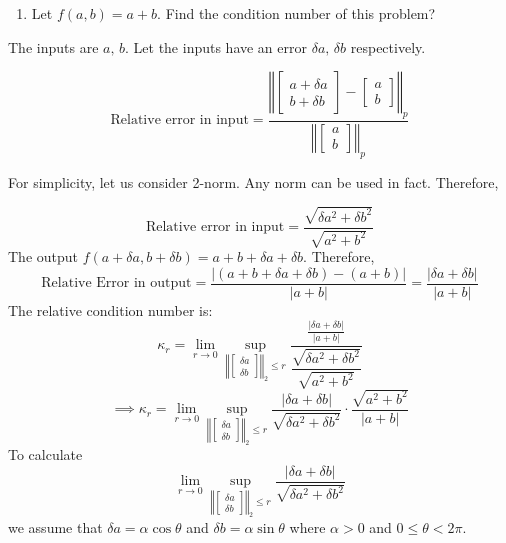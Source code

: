 \documentclass[
]{book}
\providecommand{\tightlist}{%
  \setlength{\itemsep}{0pt}\setlength{\parskip}{0pt}}
\begin{document}
\begin{enumerate}
\def\labelenumi{\arabic{enumi}.}
\tightlist
\item
  Let \(f(a,b) = a+b\). Find the condition number of this problem?
\end{enumerate}

The inputs are \(a,\, b\). Let the inputs have an error \(\delta a,\, \delta b\) respectively.

\[\text{Relative error in input} = \dfrac{\left\Vert \begin{bmatrix} a+\delta a\\ b+\delta b \end{bmatrix}- \begin{bmatrix} a\\  b \end{bmatrix}\right\Vert_p}{\left\Vert \begin{bmatrix} a\\ b \end{bmatrix}\right\Vert_p}\]

For simplicity, let us consider 2-norm. Any norm can be used in fact. Therefore,

\[\text{Relative error in input} =\dfrac{\sqrt{\delta a^2+\delta b^2}}{\sqrt{a^2+b^2}}\]
The output \(f(a+\delta a,b+\delta b) = a+b+\delta a+\delta b\). Therefore,
\[\text{Relative Error in output} = \dfrac{|(a+b+\delta a + \delta b)-(a+b)|}{|a+b|} = \frac{|\delta a+\delta b|}{|a+b|}\]
The relative condition number is:
\[\kappa_r = \lim_{r\to 0} \sup_{\left\Vert\begin{bmatrix} \delta a\\ \delta b \end{bmatrix}\right\Vert_2\le r} \dfrac{\frac{|\delta a+\delta b|}{|a+b|}}{\dfrac{\sqrt{\delta a^2+\delta b^2}}{\sqrt{a^2+b^2}}}\]
\[\implies \kappa_r = \lim_{r\to 0} \sup_{\left\Vert\begin{bmatrix} \delta a\\ \delta b \end{bmatrix}\right\Vert_2\le r} \dfrac{|\delta a+\delta b|}{\sqrt{\delta a^2+\delta b^2}} \cdot \dfrac{\sqrt{a^2+b^2}}{|a+b|} \]
To calculate \[\lim_{r\to 0} \sup_{\left\Vert\begin{bmatrix} \delta a\\ \delta b \end{bmatrix}\right\Vert_2\le r}\dfrac{|\delta a+\delta b|}{\sqrt{\delta a^2+\delta b^2}}\] we assume that \(\delta a = \alpha \cos \theta\) and \(\delta b = \alpha \sin \theta\) where \(\alpha>0\) and \(0\le\theta<2\pi\).
\end{document}
